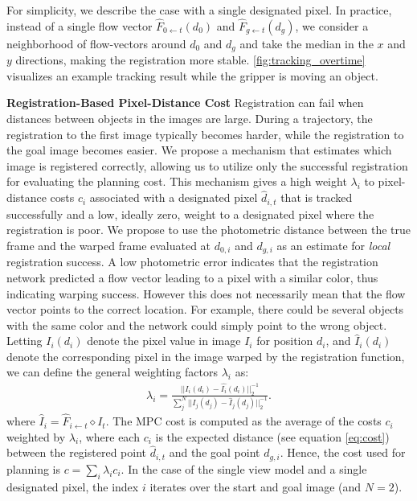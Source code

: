 For simplicity, we describe the case with a single designated pixel. In practice, instead of a single flow vector $\hat{F}_{0 \leftarrow t}(d_0)$ and $\hat{F}_{g \leftarrow t}(d_g)$, we consider a neighborhood of flow-vectors around $d_0$ and $d_g$ and take the median in the $x$ and $y$ directions, making the registration more stable.
\autoref{fig:tracking_overtime} visualizes an example tracking result while the gripper is moving an object.

\textbf{Registration-Based Pixel-Distance Cost}
Registration can fail when distances between objects in the images are large. During a trajectory, the registration to the first image typically becomes harder, while the registration to the goal image becomes easier. We propose a mechanism that estimates which image is registered correctly, allowing us to utilize only the successful registration for evaluating the planning cost. This mechanism gives a high weight $\lambda_i$ to pixel-distance costs $c_i$ associated with a designated pixel $\hat{d}_{i,t}$ that is tracked successfully and a low, ideally zero, weight to a designated pixel where the registration is poor. We propose to use the photometric distance between the true frame and the warped frame evaluated at $d_{0,i}$ and $d_{g,i}$ as an estimate for \emph{local} registration success. A low photometric error indicates that the registration network predicted a flow vector leading to a pixel with a similar color, thus indicating warping success. However this does not necessarily mean that the flow vector points to the correct location. For example, there could be several objects with the same color and the network could simply point to the wrong object. Letting $I_i(d_i)$ denote the pixel value in image $I_i$ for position $d_i$, and $\hat{I}_i(d_i)$ denote the corresponding pixel in the image warped by the registration function, we can define the general weighting factors $\lambda_i$ as:
\begin{align}
\lambda_i =  \frac{||I_i(d_i) - \hat{I_i}(d_i)||_2^{-1}}{\sum^N_j ||I_j(d_j) - \hat{I}_j(d_j)||^{-1}_2}.
\label{eqn:cost_avg}
\end{align}
where $\hat{I}_i = \hat{F}_{i \leftarrow t} \diamond I_t$. The MPC cost is computed as the average of the costs $c_i$ weighted by $\lambda_i$, where each $c_i$ is the expected distance (see equation \ref{eq:cost}) between the registered point $\hat{d}_{i,t}$ and the goal point $d_{g,i}$. Hence, the cost used for planning is $c = \sum_i \lambda_i c_i$.  In the case of the single view model and a single designated pixel, the index $i$ iterates over the start and goal image (and $N=2$).


